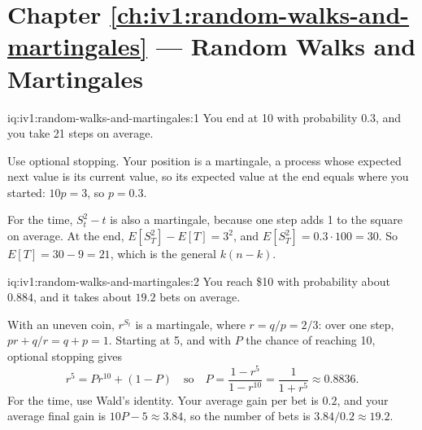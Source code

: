 \section*{Chapter \ref{ch:iv1:random-walks-and-martingales} --- Random Walks and Martingales}

\begin{solution}{iq:iv1:random-walks-and-martingales:1}
You end at 10 with probability $0.3$, and you take 21 steps on average.

Use optional stopping. Your position is a martingale, a process whose expected next value is its current value, so its expected value at the end equals where you started: $10p = 3$, so $p = 0.3$.

For the time, $S_t^2 - t$ is also a martingale, because one step adds 1 to the square on average. At the end, $E[S_T^2] - E[T] = 3^2$, and $E[S_T^2] = 0.3 \cdot 100 = 30$. So $E[T] = 30 - 9 = 21$, which is the general $k(n - k)$.

\end{solution}

\begin{solution}{iq:iv1:random-walks-and-martingales:2}
You reach \$10 with probability about $0.884$, and it takes about $19.2$ bets on average.

With an uneven coin, $r^{S_t}$ is a martingale, where $r = q/p = 2/3$: over one step, $p r + q/r = q + p = 1$. Starting at 5, and with $P$ the chance of reaching 10, optional stopping gives
\[
r^5 = P r^{10} + (1 - P) \quad\text{so}\quad P = \frac{1 - r^5}{1 - r^{10}} = \frac{1}{1 + r^5} \approx 0.8836.
\]
For the time, use Wald's identity. Your average gain per bet is $0.2$, and your average final gain is $10P - 5 \approx 3.84$, so the number of bets is $3.84/0.2 \approx 19.2$.

\end{solution}

